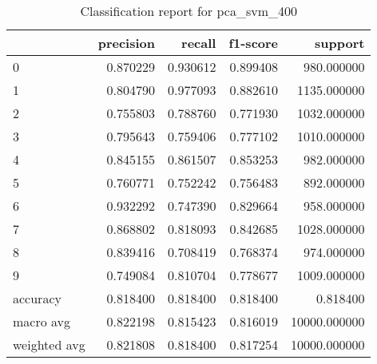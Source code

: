 \begin{table}[htb!]
\centering
\caption{Classification report for pca_svm_400}
\label{tab:classification-report-pca_svm_400}
\begin{tabular}{lrrrr}
\toprule
 & precision & recall & f1-score & support \\
\midrule
0 & 0.870229 & 0.930612 & 0.899408 & 980.000000 \\
1 & 0.804790 & 0.977093 & 0.882610 & 1135.000000 \\
2 & 0.755803 & 0.788760 & 0.771930 & 1032.000000 \\
3 & 0.795643 & 0.759406 & 0.777102 & 1010.000000 \\
4 & 0.845155 & 0.861507 & 0.853253 & 982.000000 \\
5 & 0.760771 & 0.752242 & 0.756483 & 892.000000 \\
6 & 0.932292 & 0.747390 & 0.829664 & 958.000000 \\
7 & 0.868802 & 0.818093 & 0.842685 & 1028.000000 \\
8 & 0.839416 & 0.708419 & 0.768374 & 974.000000 \\
9 & 0.749084 & 0.810704 & 0.778677 & 1009.000000 \\
accuracy & 0.818400 & 0.818400 & 0.818400 & 0.818400 \\
macro avg & 0.822198 & 0.815423 & 0.816019 & 10000.000000 \\
weighted avg & 0.821808 & 0.818400 & 0.817254 & 10000.000000 \\
\bottomrule
\end{tabular}
\end{table}
